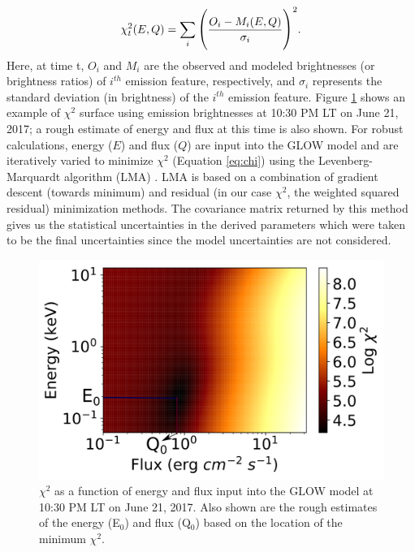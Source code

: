 \documentclass[crop=false,class=mitthesis,oneside,font=12pt]{standalone}
\begin{document}
\begin{equation}
\large
\chi^{2}_t (E,Q) = \sum_{i}\Bigg({\frac{O_{i} - M_{i} (E,Q)} {\sigma_{i}}}\Bigg)^{2}.
\label{eq:chi}
\end{equation}
Here, at time t, $O_{i}$ and $M_{i}$ are the observed and modeled brightnesses (or brightness ratios) of $ i^{th}$ emission feature, respectively, and $\sigma_{i}$ represents the standard deviation (in brightness) of the $ i^{th}$ emission feature. Figure \ref{fig:chi_eo} shows an example of $\chi^2$ surface using emission brightnesses at 10:30 PM LT on June 21, 2017; a rough estimate of energy and flux at this time is also shown. For robust calculations, energy ($E$) and flux ($Q$) are input into the GLOW model and are iteratively varied to minimize $\chi^2$ (Equation \ref{eq:chi}) using the Levenberg-Marquardt algorithm (LMA) \citep{levenberg,marquardt}. LMA is based on a combination of gradient descent (towards minimum) and residual (in our case $\chi^2$, the weighted squared residual) minimization methods. The covariance matrix returned by this method gives us the statistical uncertainties in the derived parameters which were taken to be the final uncertainties since the model uncertainties are not considered. 
\begin{figure}[H]
	\centering\includegraphics[width=35pc]{chi_eo.png}
	\caption{ $\chi^2$ as a function of energy and flux input into the GLOW model at 10:30 PM LT on June 21, 2017. Also shown are the rough estimates of the energy (E$_0$) and flux (Q$_0$) based on the location of the minimum $\chi^2$.}
	\label{fig:chi_eo}
\end{figure}
\end{document}
